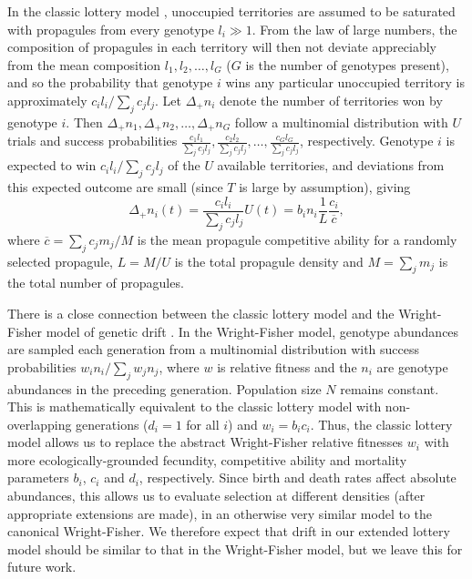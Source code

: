 \documentclass[11pt]{article}
\begin{document}
In the classic lottery model \citep{chesson_1981}, unoccupied territories are assumed to be saturated with propagules from every genotype $l_i\gg 1$. From the law of large numbers, the composition of propagules in each territory will then not deviate appreciably from the mean composition $l_1,l_2,\ldots,l_G$ ($G$ is the number of genotypes present), and so the probability that genotype $i$ wins any particular unoccupied territory is approximately $c_i l_i/\sum_j c_j l_j$. Let $\Delta_+ n_i$ denote the number of territories won by genotype $i$. Then $\Delta_+ n_1,\Delta_+ n_2,\ldots,\Delta_+ n_G$ follow a multinomial distribution with $U$ trials and success probabilities $\frac{c_1 l_1}{\sum_j c_j l_j},\frac{c_2 l_2}{\sum_j c_j l_j},\ldots,\frac{c_G l_G}{\sum_j c_j l_j}$, respectively. Genotype $i$ is expected to win $c_i l_i/\sum_j c_j l_j$ of the $U$ available territories, and deviations from this expected outcome are small (since $T$ is large by assumption), giving 
\begin{equation}
\Delta_+ n_i(t)=\frac{c_i l_i}{\sum_j c_j l_j}U(t)=b_i n_i\frac{1}{L}\frac{c_i}{\overline{c}}, \label{eq:lottery}
\end{equation}
where $\overline{c}=\sum_j c_j m_j/M$ is the mean propagule competitive ability for a randomly selected propagule, $L=M/U$ is the total propagule density and $M=\sum_j m_j$ is the total number of propagules. 

There is a close connection between the classic lottery model and the Wright-Fisher model of genetic drift \citep{svardal_2015}. In the Wright-Fisher model, genotype abundances are sampled each generation from a multinomial distribution with success probabilities $w_i n_i/\sum_j w_j n_j$, where $w$ is relative fitness and the $n_i$ are  genotype abundances in the preceding generation. Population size $N$ remains constant. This is mathematically equivalent to the classic lottery model with non-overlapping generations ($d_i=1$ for all $i$) and $w_i=b_i c_i$. Thus, the classic lottery model allows us to replace the abstract Wright-Fisher relative fitnesses $w_i$ with more ecologically-grounded fecundity, competitive ability and mortality parameters $b_i$, $c_i$ and $d_i$, respectively. Since birth and death rates affect absolute abundances, this allows us to evaluate selection at different densities (after appropriate extensions are made), in an otherwise very similar model to the canonical Wright-Fisher. We therefore expect that drift in our extended lottery model should be similar to that in the Wright-Fisher model, but we leave this for future work. 
\end{document}
